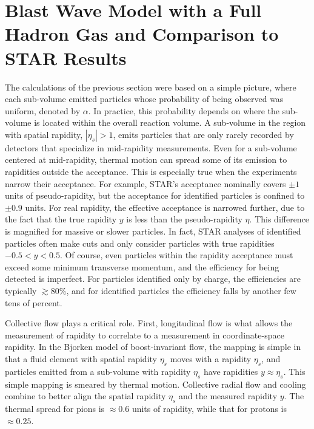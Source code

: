 
\section{Blast Wave Model with a Full Hadron Gas and Comparison to STAR Results}\label{sec:blast}

The calculations of the previous section were based on a simple picture, where each sub-volume emitted particles whose probability of being observed was uniform, denoted by $\alpha$. In practice, this probability depends on where the sub-volume is located within the overall reaction volume. A sub-volume in the region with spatial rapidity, $|\eta_s|>1$, emits particles that are only rarely recorded by detectors that specialize in mid-rapidity measurements. Even for a sub-volume centered at mid-rapidity, thermal motion can spread some of its emission to rapidities outside the acceptance. This is especially true when the experiments narrow their acceptance. For example, STAR's acceptance nominally covers $\pm 1$ units of pseudo-rapidity, but the acceptance for identified particles is confined to $\pm 0.9$ units. For real rapidity, the effective acceptance is narrowed further, due to the fact that the true rapidity $y$ is less than the pseudo-rapidity $\eta$. This difference is magnified for massive or slower particles. In fact, STAR analyses of identified particles often make cuts and only consider particles with true rapidities $-0.5<y<0.5$. Of course, even particles within the rapidity acceptance must exceed some minimum transverse momentum, and the efficiency for being detected is imperfect. For particles identified only by charge, the efficiencies are typically $\gtrsim 80\%$, and for identified particles the efficiency falls by another few tens of percent.

Collective flow plays a critical role. First, longitudinal flow is what allows the measurement of rapidity to correlate to a measurement in coordinate-space rapidity. In the Bjorken model of boost-invariant flow, the mapping is simple in that a fluid element with spatial rapidity $\eta_s$ moves with a rapidity $\eta_s$, and particles emitted from a sub-volume with rapidity $\eta_s$ have rapidities $y\approx\eta_s$. This simple mapping is smeared by thermal motion. Collective radial flow and cooling combine to better align the spatial rapidity $\eta_s$ and the measured rapidity $y$. The thermal spread for pions is $\approx 0.6$ units of rapidity, while that for protons is $\approx 0.25$.

